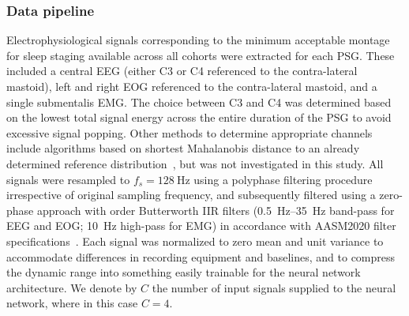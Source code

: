 \subsubsection{Data pipeline}
Electrophysiological signals corresponding to the minimum acceptable montage for sleep staging available across all cohorts were extracted for each \ac{PSG}.
These included a central \ac{EEG} (either C3 or C4 referenced to the contra-lateral mastoid), left and right \ac{EOG} referenced to the contra-lateral mastoid, and a single submentalis \ac{EMG}.
The choice between C3 and C4 was determined based on the lowest total signal energy across the entire duration of the \ac{PSG} to avoid excessive signal popping.
Other methods to determine appropriate channels include algorithms based on shortest Mahalanobis distance to an already determined reference distribution~\cite{Stephansen2018}, but was not investigated in this study.
All signals were resampled to $f_s = \SI{128}{\hertz}$ using a polyphase filtering procedure irrespective of original sampling frequency, and subsequently filtered using a zero-phase approach with  order Butterworth IIR filters (\SIrange{0.5}{35}{\hertz} band-pass for \ac{EEG} and \ac{EOG}; \SI{10}{\hertz} high-pass for \ac{EMG}) in accordance with \ac{AASM}2020 filter specifications~\cite{Berry2020}.
Each signal was normalized to zero mean and unit variance to accommodate differences in recording equipment and baselines, and to compress the dynamic range into something easily trainable for the neural network architecture.
We denote by $C$ the number of input signals supplied to the neural network, where in this case $C=4$.


